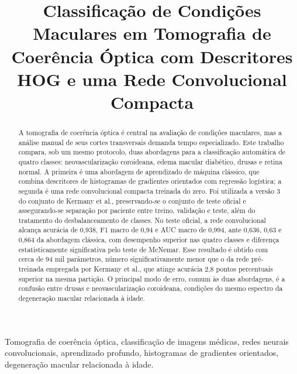 \documentclass[conference]{IEEEtran}
\begin{document}
\title{Classificação de Condições Maculares em Tomografia de Coerência Óptica com Descritores HOG e uma Rede Convolucional Compacta}

\author{
}

\maketitle

\begin{abstract}
A tomografia de coerência óptica é central na avaliação de condições maculares, mas a análise manual de seus cortes transversais demanda tempo especializado. Este trabalho compara, sob um mesmo protocolo, duas abordagens para a classificação automática de quatro classes: neovascularização coroideana, edema macular diabético, drusas e retina normal. A primeira é uma abordagem de aprendizado de máquina clássico, que combina descritores de histogramas de gradientes orientados com regressão logística; a segunda é uma rede convolucional compacta treinada do zero. Foi utilizada a versão 3 do conjunto de Kermany et al., preservando-se o conjunto de teste oficial e assegurando-se separação por paciente entre treino, validação e teste, além do tratamento do desbalanceamento de classes. No teste oficial, a rede convolucional alcança acurácia de 0,938, F1 macro de 0,94 e AUC macro de 0,994, ante 0,636, 0,63 e 0,864 da abordagem clássica, com desempenho superior nas quatro classes e diferença estatisticamente significativa pelo teste de McNemar. Esse resultado é obtido com cerca de 94 mil parâmetros, número significativamente menor que o da rede pré-treinada empregada por Kermany et al., que atinge acurácia 2,8 pontos percentuais superior na mesma partição. O principal modo de erro, comum às duas abordagens, é a confusão entre drusas e neovascularização coroideana, condições do mesmo espectro da degeneração macular relacionada à idade.
\end{abstract}

\begin{IEEEkeywords}
Tomografia de coerência óptica, classificação de imagens médicas, redes neurais convolucionais, aprendizado profundo, histogramas de gradientes orientados, degeneração macular relacionada à idade.
\end{IEEEkeywords}
\end{document}
